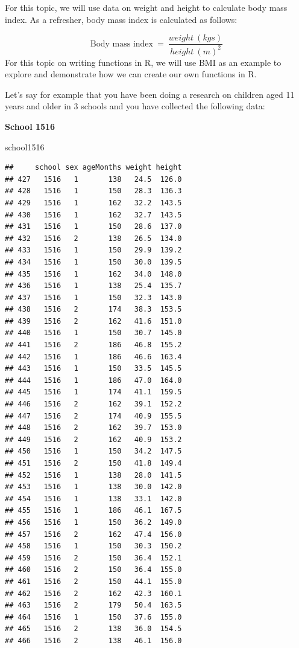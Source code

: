 \documentclass[
  12pt,
]{book}
\newenvironment{Shaded}{\begin{snugshade}}{\end{snugshade}}
\newcommand{\NormalTok}[1]{#1}
\begin{document}
For this topic, we will use data on weight and height to calculate body mass index. As a refresher, body mass index is calculated as follows:

\[ \text{Body mass index} ~=~ \frac{weight ~ (kgs)}{height ~ (m) ^ 2} \]
For this topic on writing functions in R, we will use BMI as an example to explore and demonstrate how we can create our own functions in R.

Let's say for example that you have been doing a research on children aged 11 years and older in 3 schools and you have collected the following data:

\textbf{School 1516}

\begin{Shaded}
\begin{Highlighting}[]
\NormalTok{school1516}
\end{Highlighting}
\end{Shaded}

\begin{verbatim}
##     school sex ageMonths weight height
## 427   1516   1       138   24.5  126.0
## 428   1516   1       150   28.3  136.3
## 429   1516   1       162   32.2  143.5
## 430   1516   1       162   32.7  143.5
## 431   1516   1       150   28.6  137.0
## 432   1516   2       138   26.5  134.0
## 433   1516   1       150   29.9  139.2
## 434   1516   1       150   30.0  139.5
## 435   1516   1       162   34.0  148.0
## 436   1516   1       138   25.4  135.7
## 437   1516   1       150   32.3  143.0
## 438   1516   2       174   38.3  153.5
## 439   1516   2       162   41.6  151.0
## 440   1516   1       150   30.7  145.0
## 441   1516   2       186   46.8  155.2
## 442   1516   1       186   46.6  163.4
## 443   1516   1       150   33.5  145.5
## 444   1516   1       186   47.0  164.0
## 445   1516   1       174   41.1  159.5
## 446   1516   2       162   39.1  152.2
## 447   1516   2       174   40.9  155.5
## 448   1516   2       162   39.7  153.0
## 449   1516   2       162   40.9  153.2
## 450   1516   1       150   34.2  147.5
## 451   1516   2       150   41.8  149.4
## 452   1516   1       138   28.0  141.5
## 453   1516   1       138   30.0  142.0
## 454   1516   1       138   33.1  142.0
## 455   1516   1       186   46.1  167.5
## 456   1516   1       150   36.2  149.0
## 457   1516   2       162   47.4  156.0
## 458   1516   1       150   30.3  150.2
## 459   1516   2       150   36.4  152.1
## 460   1516   2       150   36.4  155.0
## 461   1516   2       150   44.1  155.0
## 462   1516   2       162   42.3  160.1
## 463   1516   2       179   50.4  163.5
## 464   1516   1       150   37.6  155.0
## 465   1516   2       138   36.0  154.5
## 466   1516   2       138   46.1  156.0
\end{verbatim}
\end{document}
